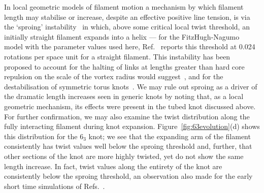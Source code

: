 In local geometric models of filament motion a mechanism by which filament length may stabilise or increase, despite an effective positive line tension, is via the `sproing' instability~\citep{WinfreeChapter} in which, above some critical local twist threshold, an initially straight filament expands into a helix --- for the FitzHugh-Nagumo model with the parameter values used here, Ref.~\citep{Henze1993} reports this threshold at 0.024 rotations per space unit for a straight filament. This instability has been proposed to account for the halting of links at lengths greater than hard core repulsion on the scale of the vortex radius would suggest~\citep{WinfreeChapter}, and for the destabilisation of symmetric torus knots~\citep{Maucher2017}. We may rule out sproing as a driver of the dramatic length increases seen in generic knots by noting that, as a local geometric mechanism, its effects were present in the tubed knot discussed above. For further confirmation, we may also examine the twist distribution along the fully interacting filament during knot expansion. Figure~\ref{fig:63evolution}(d) shows this distribution for the $6_3$ knot; we see that the expanding arm of the filament consistently has twist values well below the sproing threshold and, further, that other sections of the knot are more highly twisted, yet do not show the same length increase. In fact, twist values along the entirety of the knot are consistently below the sproing threshold, an observation also made for the early short time simulations of Refs.~\citep{Henze1993,WinfreeChapter}. 

